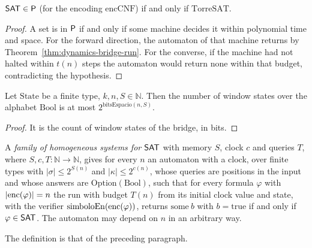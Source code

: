 \begin{theorem}
  \label{thm:dynamics-tower-iff}
  \leanok
  $\mathsf{SAT} \in \mathsf{P}$ (for the encoding $\mathrm{encCNF}$) if and only if $\mathrm{TorreSAT}$.
  \own{}
\end{theorem}

\begin{proof}
  \leanok
  A set is in $\mathsf{P}$ if and only if some machine decides it within polynomial time and space. For the
  forward direction, the automaton of that machine returns by Theorem~\ref{thm:dynamics-bridge-run}.
  For the converse, if the machine had not halted within $t(n)$ steps the automaton would return
  $\mathrm{none}$ within that budget, contradicting the hypothesis.
\end{proof}

\begin{theorem}
  \label{thm:dynamics-tower-memory}
  \leanok
  Let $\mathrm{State}$ be a finite type, $k, n, S \in \mathbb{N}$. Then the number of window states
  over the alphabet $\mathrm{Bool}$ is at most $2^{\mathrm{bitsEspacio}(n, S)}$.
  \own{}
\end{theorem}

\begin{proof}
  \leanok
  It is the count of window states of the bridge, in bits.
\end{proof}

A \emph{family of homogeneous systems for $\mathsf{SAT}$} with memory $S$, clock $c$ and queries $T$, where
$S, c, T : \mathbb{N} \to \mathbb{N}$, gives for every $n$ an automaton with a clock, over finite
types with $|\sigma| \le 2^{S(n)}$ and $|\kappa| \le 2^{c(n)}$, whose queries are positions in the
input and whose answers are $\mathrm{Option}(\mathrm{Bool})$, such that for every formula $\varphi$
with $|\mathrm{enc}(\varphi)| = n$ the run with budget $T(n)$ from its initial clock value and state, with
the verifier $\mathrm{simboloEn}(\mathrm{enc}(\varphi))$, returns $\mathrm{some}\ b$ with
$b = \mathrm{true}$ if and only if $\varphi \in \mathsf{SAT}$. The automaton may depend on $n$ in an
arbitrary way.

\begin{definition}
  \label{def:dynamics-family-sat}
  \leanok
  The definition is that of the preceding paragraph.
  \own{}
\end{definition}

